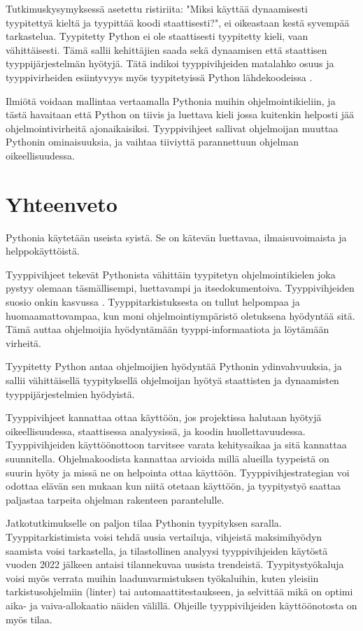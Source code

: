 \begin{otherlanguage}{finnish}
Tutkimuskysymyksessä asetettu ristiriita: "Miksi käyttää dynaamisesti tyypitettyä kieltä ja tyypittää koodi staattisesti?", ei oikeastaan kestä syvempää tarkastelua. Tyypitetty Python ei ole staattisesti tyypitetty kieli, vaan vähittäisesti. Tämä sallii kehittäjien saada sekä dynaamisen että staattisen tyyppijärjestelmän hyötyjä. Tätä indikoi tyyppivihjeiden matalahko osuus ja tyyppivirheiden esiintyvyys myös tyypitetyissä Python lähdekoodeissa \cite{di_grazia_evolution_2022, rak-amnouykit_taleoftwo_2020}.

Ilmiötä voidaan mallintaa vertaamalla Pythonia muihin ohjelmointikieliin, ja tästä havaitaan että Python on tiivis ja luettava kieli jossa kuitenkin helposti jää ohjelmointivirheitä ajonaikaisiksi. Tyyppivihjeet sallivat ohjelmoijan muuttaa Pythonin ominaisuuksia, ja vaihtaa tiiviyttä parannettuun ohjelman oikeellisuudessa.

\section*{Yhteenveto}

Pythonia käytetään useista syistä. Se on kätevän luettavaa, ilmaisuvoimaista ja helppokäyttöistä.

Tyyppivihjeet tekevät Pythonista vähittäin tyypitetyn ohjelmointikielen joka pystyy olemaan täsmällisempi, luettavampi ja itsedokumentoiva. Tyyppivihjeiden suosio onkin kasvussa \cite{jin_where_to_start_2021, khan_empirical_2022}. Tyyppitarkistuksesta on tullut helpompaa ja huomaamattovampaa, kun moni ohjelmointiympäristö oletuksena hyödyntää sitä. Tämä auttaa ohjelmoijia hyödyntämään tyyppi-informaatiota ja löytämään virheitä.

Tyypitetty Python antaa ohjelmoijien hyödyntää Pythonin ydinvahvuuksia, ja sallii vähittäisellä tyypityksellä ohjelmoijan hyötyä staattisten ja dynaamisten tyyppijärjestelmien hyödyistä.

Tyyppivihjeet kannattaa ottaa käyttöön, jos projektissa halutaan hyötyjä oikeellisuudessa, staattisessa analyysissä, ja koodin huollettavuudessa. Tyyppivihjeiden käyttöönottoon tarvitsee varata kehitysaikaa ja sitä kannattaa suunnitella. Ohjelmakoodista kannattaa arvioida millä alueilla tyypeistä on suurin hyöty ja missä ne on helpointa ottaa käyttöön. Tyyppivihjestrategian voi odottaa elävän sen mukaan kun niitä otetaan käyttöön, ja tyypitystyö saattaa paljastaa tarpeita ohjelman rakenteen parantelulle.

Jatkotutkimukselle on paljon tilaa Pythonin tyypityksen saralla. Tyyppitarkistimista voisi tehdä uusia vertailuja, vihjeistä maksimihyödyn saamista voisi tarkastella, ja tilastollinen analyysi tyyppivihjeiden käytöstä vuoden 2022 jälkeen antaisi tilannekuvaa uusista trendeistä. Tyypitystyökaluja voisi myös verrata muihin laadunvarmistuksen työkaluihin, kuten yleisiin tarkistusohjelmiin (linter) tai automaattitestaukseen, ja selvittää mikä on optimi aika- ja vaiva-allokaatio näiden välillä. Ohjeille tyyppivihjeiden käyttöönotosta on myös tilaa.
\end{otherlanguage}
